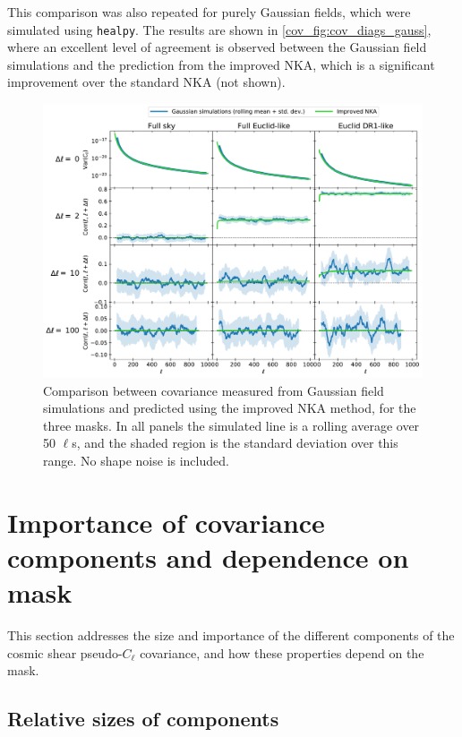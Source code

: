 This comparison was also repeated for purely Gaussian fields, which were simulated using \texttt{healpy}.
The results are shown in \autoref{cov_fig:cov_diags_gauss}, where an excellent level of agreement is observed between the Gaussian field simulations and the prediction from the improved NKA, which is a significant improvement over the standard NKA (not shown).

\begin{figure}
\includegraphics[width=\textwidth]{cov_diags_gauss}
\caption{Comparison between covariance measured from Gaussian field simulations and predicted using the improved NKA method, for the three masks. In all panels the simulated line is a rolling average over 50 $\ell$s, and the shaded region is the standard deviation over this range. No shape noise is included.}
\label{cov_fig:cov_diags_gauss}
\end{figure}

\section{Importance of covariance components and dependence on mask}
\label{cov_sec:importance}

This section addresses the size and importance of the different components of the cosmic shear pseudo-$C_\ell$ covariance, and how these properties depend on the mask.

\subsection{Relative sizes of components}
\label{cov_sec:rel_sizes}

